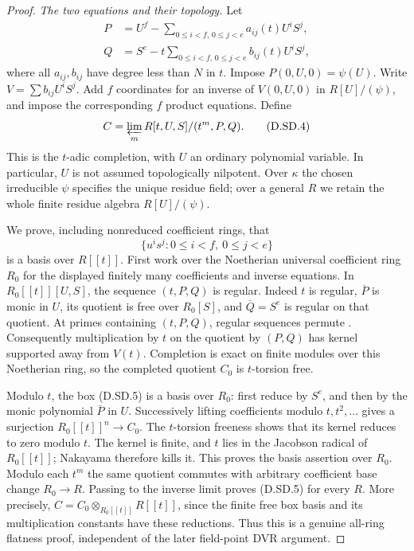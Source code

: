 \begin{proof}
\emph{The two equations and their topology.}
Let
\[
 \begin{split}
 P&=U^f-\sum_{0\le i<f,\,0\le j<e} a_{ij}(t)U^iS^j,\\
 Q&=S^e-t\sum_{0\le i<f,\,0\le j<e} b_{ij}(t)U^iS^j,
 \end{split}                                            \tag{D.SD.3}
\]
where all $a_{ij},b_{ij}$ have degree less than $N$ in $t$.
Impose $P(0,U,0)=\psi(U)$.  Write $V=\sum b_{ij}U^iS^j$.
Add $f$ coordinates for an inverse of $V(0,U,0)$ in
$R[U]/(\psi)$, and impose the corresponding $f$ product equations.
Define
\[
 C=\varprojlim_m R[t,U,S]/(t^m,P,Q).
                                                        \tag{D.SD.4}
\]
This is the $t$-adic completion, with $U$ an ordinary polynomial
variable.  In particular, $U$ is not assumed topologically
nilpotent.  Over $\kappa$ the chosen irreducible $\psi$ specifies
the unique residue field; over a general $R$ we retain the whole
finite residue algebra $R[U]/(\psi)$.

We prove, including nonreduced coefficient rings, that
\[
                 \{u^is^j:0\le i<f,\ 0\le j<e\}
                                                        \tag{D.SD.5}
\]
is a basis over $R[[t]]$.  First work over the Noetherian universal
coefficient ring $R_0$ for the displayed finitely many coefficients
and inverse equations.  In $R_0[[t]][U,S]$, the sequence
$(t,P,Q)$ is regular.  Indeed $t$ is regular, $\overline P$
is monic in $U$, its quotient is free over $R_0[S]$, and
$\overline Q=S^e$ is regular on that quotient.
At primes containing $(t,P,Q)$, regular sequences permute
\citep[Lemma~10.68.4, complete proof, Tag 00LJ]{StacksSparseDVRB}.
Consequently multiplication by $t$ on the quotient by $(P,Q)$
has kernel supported away from $V(t)$.  Completion is exact on
finite modules over this Noetherian ring, so the completed
quotient $C_0$ is $t$-torsion free.

Modulo $t$, the box (D.SD.5) is a basis over $R_0$:
first reduce by $S^e$, and then by the monic polynomial
$\overline P$ in $U$.  Successively lifting coefficients modulo
$t,t^2,\ldots$ gives a surjection
$R_0[[t]]^n\to C_0$.  The $t$-torsion freeness shows that its
kernel reduces to zero modulo $t$.  The kernel is finite,
and $t$ lies in the Jacobson radical of $R_0[[t]]$; Nakayama
therefore kills it.  This proves the basis assertion over $R_0$.
Modulo each $t^m$ the same quotient commutes with arbitrary
coefficient base change $R_0\to R$.  Passing to the inverse
limit proves (D.SD.5) for every $R$.  More precisely,
$C=C_0\otimes_{R_0[[t]]}R[[t]]$, since the finite free box basis
and its multiplication constants have these reductions.
Thus this is a genuine all-ring flatness proof, independent
of the later field-point DVR argument.


\end{proof}
